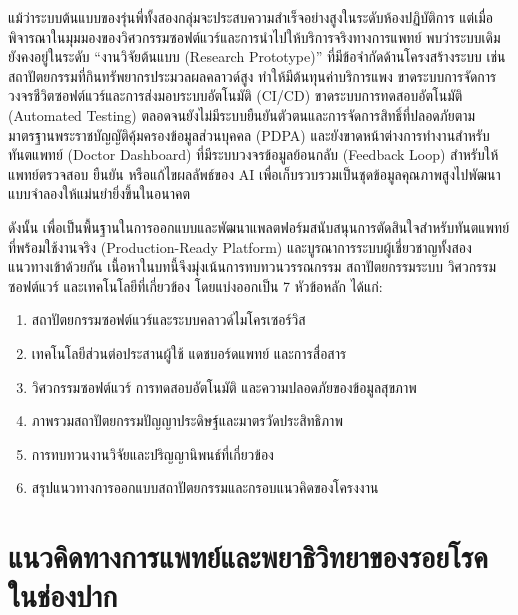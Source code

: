 แม้ว่าระบบต้นแบบของรุ่นพี่ทั้งสองกลุ่มจะประสบความสำเร็จอย่างสูงในระดับห้องปฏิบัติการ แต่เมื่อพิจารณาในมุมมองของวิศวกรรมซอฟต์แวร์และการนำไปให้บริการจริงทางการแพทย์ พบว่าระบบเดิมยังคงอยู่ในระดับ ``งานวิจัยต้นแบบ (Research Prototype)'' ที่มีข้อจำกัดด้านโครงสร้างระบบ เช่น สถาปัตยกรรมที่กินทรัพยากรประมวลผลคลาวด์สูง ทำให้มีต้นทุนค่าบริการแพง ขาดระบบการจัดการวงจรชีวิตซอฟต์แวร์และการส่งมอบระบบอัตโนมัติ (CI/CD) ขาดระบบการทดสอบอัตโนมัติ (Automated Testing) ตลอดจนยังไม่มีระบบยืนยันตัวตนและการจัดการสิทธิ์ที่ปลอดภัยตามมาตรฐานพระราชบัญญัติคุ้มครองข้อมูลส่วนบุคคล (PDPA) และยังขาดหน้าต่างการทำงานสำหรับทันตแพทย์ (Doctor Dashboard) ที่มีระบบวงจรข้อมูลย้อนกลับ (Feedback Loop) สำหรับให้แพทย์ตรวจสอบ ยืนยัน หรือแก้ไขผลลัพธ์ของ AI เพื่อเก็บรวบรวมเป็นชุดข้อมูลคุณภาพสูงไปพัฒนาแบบจำลองให้แม่นยำยิ่งขึ้นในอนาคต

ดังนั้น เพื่อเป็นพื้นฐานในการออกแบบและพัฒนาแพลตฟอร์มสนับสนุนการตัดสินใจสำหรับทันตแพทย์ที่พร้อมใช้งานจริง (Production-Ready Platform) และบูรณาการระบบผู้เชี่ยวชาญทั้งสองแนวทางเข้าด้วยกัน เนื้อหาในบทนี้จึงมุ่งเน้นการทบทวนวรรณกรรม สถาปัตยกรรมระบบ วิศวกรรมซอฟต์แวร์ และเทคโนโลยีที่เกี่ยวข้อง โดยแบ่งออกเป็น 7 หัวข้อหลัก ได้แก่:
\begin{enumerate}
    \item สถาปัตยกรรมซอฟต์แวร์และระบบคลาวด์ไมโครเซอร์วิส
    \item เทคโนโลยีส่วนต่อประสานผู้ใช้ แดชบอร์ดแพทย์ และการสื่อสาร
    \item วิศวกรรมซอฟต์แวร์ การทดสอบอัตโนมัติ และความปลอดภัยของข้อมูลสุขภาพ
    \item ภาพรวมสถาปัตยกรรมปัญญาประดิษฐ์และมาตรวัดประสิทธิภาพ
    \item การทบทวนงานวิจัยและปริญญานิพนธ์ที่เกี่ยวข้อง
    \item สรุปแนวทางการออกแบบสถาปัตยกรรมและกรอบแนวคิดของโครงงาน
\end{enumerate}

\section{แนวคิดทางการแพทย์และพยาธิวิทยาของรอยโรคในช่องปาก}
\label{sec:medical_pathology}

